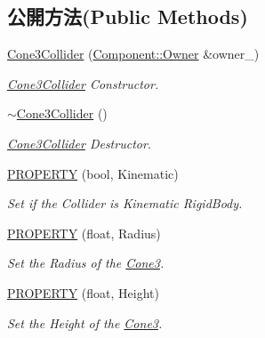 \subsection*{公開方法(Public Methods)}
\begin{DoxyCompactItemize}
\item 
\hyperlink{class_i_dream_sky_1_1_cone3_collider_aabfb5ab06a1f03e6835f6cef119b2376}{Cone3\+Collider} (\hyperlink{class_i_dream_sky_1_1_component_1_1_owner}{Component\+::\+Owner} \&owner\+\_\+)
\begin{DoxyCompactList}\small\item\em \hyperlink{class_i_dream_sky_1_1_cone3_collider}{Cone3\+Collider} Constructor. \end{DoxyCompactList}\item 
\hyperlink{class_i_dream_sky_1_1_cone3_collider_a5907a81bd67777d53b2c9c7fb75a7619}{$\sim$\+Cone3\+Collider} ()
\begin{DoxyCompactList}\small\item\em \hyperlink{class_i_dream_sky_1_1_cone3_collider}{Cone3\+Collider} Destructor. \end{DoxyCompactList}\item 
\hyperlink{class_i_dream_sky_1_1_cone3_collider_a108405162a1c16d285fbfde5efebe23c}{P\+R\+O\+P\+E\+R\+TY} (bool, Kinematic)
\begin{DoxyCompactList}\small\item\em Set if the Collider is Kinematic Rigid\+Body. \end{DoxyCompactList}\item 
\hyperlink{class_i_dream_sky_1_1_cone3_collider_aa4ac0413abcadea57adcdd3a830789a3}{P\+R\+O\+P\+E\+R\+TY} (float, Radius)
\begin{DoxyCompactList}\small\item\em Set the Radius of the \hyperlink{class_i_dream_sky_1_1_cone3}{Cone3}. \end{DoxyCompactList}\item 
\hyperlink{class_i_dream_sky_1_1_cone3_collider_ab333ada51aa4ba9d7ad30e83f48a1213}{P\+R\+O\+P\+E\+R\+TY} (float, Height)
\begin{DoxyCompactList}\small\item\em Set the Height of the \hyperlink{class_i_dream_sky_1_1_cone3}{Cone3}. \end{DoxyCompactList}\end{DoxyCompactItemize}
